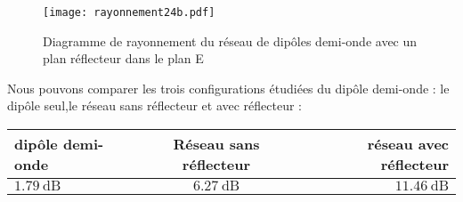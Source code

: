 \begin{figure}[htbp]
  \centering
  \texttt{[image: rayonnement24b.pdf]}
  \caption{Diagramme de rayonnement du réseau de dipôles demi-onde avec un plan réflecteur dans le plan E\label{fig:rayonnement4reflecteur}}
\end{figure}

Nous pouvons comparer les trois configurations étudiées du dipôle demi-onde : le dipôle seul,le réseau sans réflecteur et avec réflecteur :

\begin{tabular}{|l|c|r|}
  \hline
       dipôle demi-onde & Réseau sans réflecteur & réseau avec réflecteur \\
  \hline
  $\SI{1.79}{\deci\bel}$ & $\SI{6.27}{\deci\bel}$ & $\SI{11.46}{\deci\bel}$ \\
  \hline
\end{tabular}



